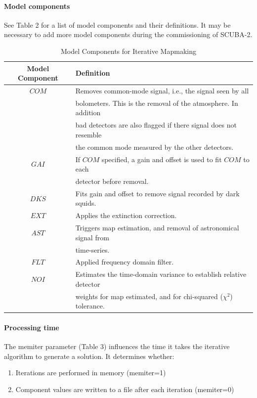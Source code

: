 \documentclass[twoside,11pt]{article}
\renewcommand{\_}{\texttt{\symbol{95}}}
\begin{document}
\paragraph{Model components}

See Table 2 for a list of model components and their definitions. It
may be necessary to add more model components during the commissioning
of SCUBA-2.
\begin{table}
\begin{tabular}{cl}
 Model Component & Definition \\
\hline
$COM$ & Removes common-mode signal, i.e., the signal seen by all \\
      & bolometers. This is the removal of the atmosphere. In addition \\
      & bad detectors are also flagged if there signal does not resemble \\
      & the common mode measured by the other detectors. \\
$GAI$ & If $COM$ specified, a gain and offset is used to fit $COM$ to each \\
      & detector before removal. \\
$DKS$ & Fits gain and offset to remove signal recorded by dark squids. \\  
$EXT$ & Applies the extinction correction. \\
$AST$ & Triggers map estimation, and removal of astronomical signal from \\
      & time-series. \\
$FLT$ & Applied frequency domain filter. \\
$NOI$ & Estimates the time-domain variance to establish relative detector \\ 
      & weights for map estimated, and for chi-squared ($\chi^2$) tolerance. \\
\end{tabular}
\caption{Model Components for Iterative Mapmaking}
\label{tab:dimm_components}
\end{table}

\paragraph{Processing time}

The memiter parameter (Table 3) influences the time it takes the iterative
algorithm to generate a solution. It determines whether:
\begin{enumerate}
\item Iterations are performed in memory (memiter=1)
\item Component values are written to a file after each iteration
  (memiter=0)
\end{enumerate}
\end{document}
